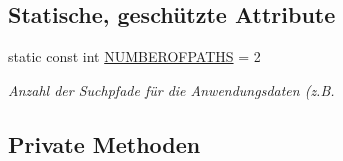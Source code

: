 \subsection*{Statische, geschützte Attribute}
\begin{DoxyCompactItemize}
\item 
static const int \hyperlink{classGUIMainWindow_ae3eb6747c8ffa9e20e54c2d34f58bd40}{N\-U\-M\-B\-E\-R\-O\-F\-P\-A\-T\-H\-S} = 2
\begin{DoxyCompactList}\small\item\em Anzahl der Suchpfade für die Anwendungsdaten (z.\-B. \end{DoxyCompactList}\end{DoxyCompactItemize}
\subsection*{Private Methoden}
